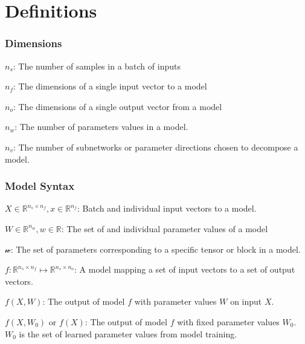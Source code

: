 \documentclass{article}
\theoremstyle{plain}
\theoremstyle{definition}
\theoremstyle{remark}
\begin{document}
\clearpage




\newpage
\appendix
\renewcommand{\thefigure}{S\arabic{figure}}  %
\renewcommand{\theHfigure}{S\arabic{figure}} %
\setcounter{figure}{0}  %
\onecolumn


\section{Definitions}

\subsubsection{Dimensions}
$n_s$: The number of samples in a batch of inputs 

$n_f$: The dimensions of a single input vector to a model

$n_o$: The dimensions of a single output vector from a model

$n_w$: The number of parameters values in a model.

$n_v$: The number of subnetworks or parameter directions chosen to decompose a model. 


\subsubsection{Model Syntax}
$X \in \mathbb{R}^{n_s \times n_f}, x \in \mathbb{R}^{n_f}$: Batch and individual input vectors to a model.

$W \in \mathbb{R}^{n_w}, w \in \mathbb{R}$: The set of and individual parameter values of a model

$\mathcal{w}$: The set of parameters corresponding to a specific tensor or block in a model.

$f: \mathbb{R}^{n_s \times n_f} \mapsto \mathbb{R}^{n_s \times n_o}$: A model mapping a set of input vectors to a set of output vectors.

$f(X, W)$: The output of model $f$ with parameter values $W$ on input $X$.

$f(X, W_0)$ or $f(X)$: The output of model $f$ with fixed parameter values $W_0 $. $W_0$ is the set of learned parameter values from model training.
\end{document}

